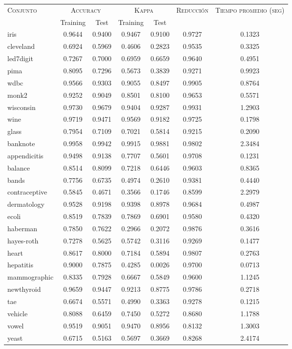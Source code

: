 \begin{table}[]
\centering
\begin{tabular}{l c c c c c c}
\hline
\multirow{2}{*}{\textsc{Conjunto}}
	& \multicolumn{2}{c}{\textsc{Accuracy}}
	& \multicolumn{2}{c}{\textsc{Kappa}}
	& \textsc{Reducción}
	& \textsc{Tiempo promedio (seg)} \\
	& Training & Test
	& Training & Test \\ 
\hline
\hline

iris & 0.9644 & 0.9400 & 0.9467 & 0.9100 & 0.9727 & 0.1323 \\
cleveland & 0.6924 & 0.5969 & 0.4606 & 0.2823 & 0.9535 & 0.3325 \\
led7digit & 0.7267 & 0.7000 & 0.6959 & 0.6659 & 0.9640 & 0.4951 \\
pima & 0.8095 & 0.7296 & 0.5673 & 0.3839 & 0.9271 & 0.9923 \\
wdbc & 0.9566 & 0.9303 & 0.9055 & 0.8497 & 0.9905 & 0.8764 \\
monk2 & 0.9252 & 0.9049 & 0.8501 & 0.8100 & 0.9653 & 0.5571 \\
wisconsin & 0.9730 & 0.9679 & 0.9404 & 0.9287 & 0.9931 & 1.2903 \\
wine & 0.9719 & 0.9471 & 0.9569 & 0.9182 & 0.9725 & 0.1798 \\
glass & 0.7954 & 0.7109 & 0.7021 & 0.5814 & 0.9215 & 0.2090 \\
banknote & 0.9958 & 0.9942 & 0.9915 & 0.9881 & 0.9802 & 2.3484 \\
appendicitis & 0.9498 & 0.9138 & 0.7707 & 0.5601 & 0.9708 & 0.1231 \\
balance & 0.8514 & 0.8099 & 0.7218 & 0.6446 & 0.9603 & 0.8365 \\
bands & 0.7756 & 0.6735 & 0.4974 & 0.2610 & 0.9381 & 0.4440 \\
contraceptive & 0.5845 & 0.4671 & 0.3566 & 0.1746 & 0.8599 & 2.2979 \\
dermatology & 0.9528 & 0.9198 & 0.9398 & 0.8978 & 0.9684 & 0.4987 \\
ecoli & 0.8519 & 0.7839 & 0.7869 & 0.6901 & 0.9580 & 0.4320 \\
haberman & 0.7850 & 0.7622 & 0.2966 & 0.2072 & 0.9876 & 0.3616 \\
hayes-roth & 0.7278 & 0.5625 & 0.5742 & 0.3116 & 0.9269 & 0.1477 \\
heart & 0.8617 & 0.8000 & 0.7184 & 0.5894 & 0.9807 & 0.2763 \\
hepatitis & 0.9000 & 0.7875 & 0.4285 & 0.0026 & 0.9700 & 0.0713 \\
mammographic & 0.8335 & 0.7928 & 0.6667 & 0.5849 & 0.9600 & 1.1245 \\
newthyroid & 0.9659 & 0.9447 & 0.9213 & 0.8775 & 0.9786 & 0.2718 \\
tae & 0.6674 & 0.5571 & 0.4990 & 0.3363 & 0.9278 & 0.1215 \\
vehicle & 0.8088 & 0.6459 & 0.7450 & 0.5272 & 0.8680 & 1.1788 \\
vowel & 0.9519 & 0.9051 & 0.9470 & 0.8956 & 0.8132 & 1.3003 \\
yeast & 0.6715 & 0.5163 & 0.5697 & 0.3669 & 0.8268 & 2.4174 \\


\end{tabular}
\end{table}
